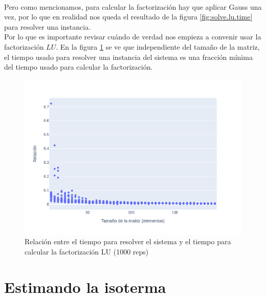\documentclass[12pt]{article}
\begin{document}
\paragraph{} Pero como mencionamos, para calcular la factorización hay que aplicar Gauss una vez, por lo que en realidad nos queda el resultado de la figura \ref{fig:solve.lu.time} para resolver una instancia. \\
Por lo que es importante revisar cuándo de verdad nos empieza a convenir usar la factorización \(LU\). En la figura \ref{fig:pct_lu.time} se ve que independiente del tamaño de la matriz, el tiempo usado para resolver una instancia del sistema es una fracción mínima del tiempo usado para calcular la factorización. %



\begin{figure}[H]
\centering
\includegraphics[width=\textwidth]{times.pct_lu}
\caption{Relación entre el tiempo para resolver el sistema y el tiempo para calcular la factorización LU (1000 reps)}
\label{fig:pct_lu.time}
\end{figure}

\section{Estimando la isoterma}
\end{document}
